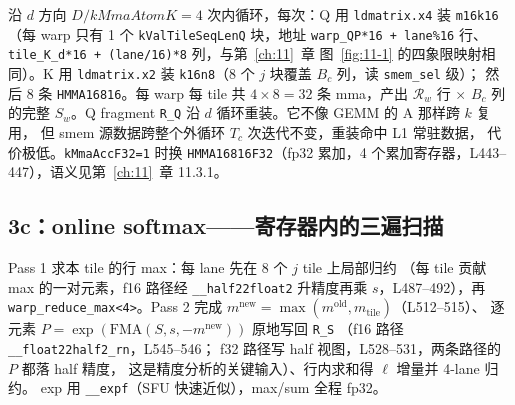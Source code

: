 沿 $d$ 方向 $D/kMmaAtomK = 4$ 次内循环，每次：Q 用
\texttt{ldmatrix.x4} 装 \texttt{m16k16}（每 warp 只有 1 个
\texttt{k\allowbreak{}Val\allowbreak{}Tile\allowbreak{}Seq\allowbreak{}Len\allowbreak{}Q} 块，地址 \texttt{warp\_QP*16 + lane\%16} 行、
\texttt{tile\_K\_d*16 + (lane/16)*8} 列，与第~\ref{ch:11}~章
图~\ref{fig:11-1} 的四象限映射相同）。K 用 \texttt{ldmatrix.x2} 装
\texttt{k16n8}（8 个 $j$ 块覆盖 $B_c$ 列，读 \texttt{smem\_sel} 级）；
然后 8 条 \texttt{HMMA16816}。每 warp 每 tile 共 $4\times 8 = 32$ 条
mma，产出 $\mathcal{R}_w$ 行 $\times$ $B_c$ 列的完整 $S_w$。Q fragment
\texttt{R\_Q} 沿 $d$ 循环重装。它不像 GEMM 的 A 那样跨 $k$ 复用，
但 smem 源数据跨整个外循环 $T_c$ 次迭代不变，重装命中 L1 常驻数据，
代价极低。\texttt{k\allowbreak{}Mma\allowbreak{}Acc\allowbreak{}F32=\allowbreak{}1} 时换 \texttt{HMMA16816\allowbreak{}F32}（fp32
累加，4 个累加寄存器，L443--447），语义见第~\ref{ch:11}~章 11.3.1。

\subsection{3c：online softmax——寄存器内的三遍扫描}









Pass 1 求本 tile 的行 max：每 lane 先在 8 个 $j$ tile 上局部归约
（每 tile 贡献 max 的一对元素，f16 路径经 \texttt{\_\allowbreak{}\_\allowbreak{}half22float2}
升精度再乘 $s$，L487--492），再 \texttt{warp\_\allowbreak{}reduce\_\allowbreak{}max\allowbreak{}<4>}。Pass 2
完成 $m^{\text{new}}=\max(m^{\text{old}}, m_{\text{tile}})$（L512--515）、
逐元素 $P=\exp(\mathrm{FMA}(S, s, -m^{\text{new}}))$ 原地写回 \texttt{R\_S}
（f16 路径 \texttt{\_\allowbreak{}\_\allowbreak{}float22half2\_\allowbreak{}rn}，L545--546；
f32 路径写 half 视图，L528--531，两条路径的 $P$ 都落 half 精度，
这是精度分析的关键输入）、行内求和得 $\ell$ 增量并 4-lane 归约。
exp 用 \texttt{\_\_expf}（SFU 快速近似），max/sum 全程 fp32。

